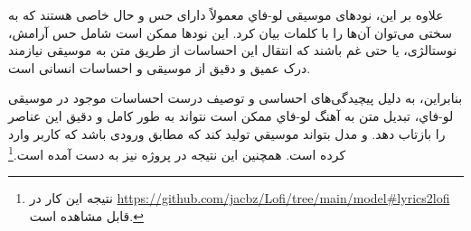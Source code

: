علاوه بر این، نودهای موسیقی ﻟﻮ-ﻓﺎﻱ معمولاً دارای حس و حال خاصی هستند که به سختی می‌توان آن‌ها را با کلمات بیان کرد. این نودها ممکن است شامل حس آرامش، نوستالژی، یا حتی غم باشند که انتقال این احساسات از طریق متن به موسیقی نیازمند درک عمیق و دقیق از موسیقی و احساسات انسانی است.

بنابراین، به دلیل پیچیدگی‌های احساسی و توصیف درست احساسات موجود در موسیقی ﻟﻮ-ﻓﺎﻱ، تبدیل متن به آهنگ ﻟﻮ-ﻓﺎﻱ ممکن است نتواند به طور کامل و دقیق این عناصر را بازتاب دهد. و مدل بتواند موسیقي تولید کند که مطابق ورودی باشد که کاربر وارد کرده است. همچنین این نتیجه در پروژه  \cite{Zhang} نیز به دست آمده است.\footnote{نتیجه این کار در \url{https://github.com/jacbz/Lofi/tree/main/model\#lyrics2lofi} قابل مشاهده است.}
